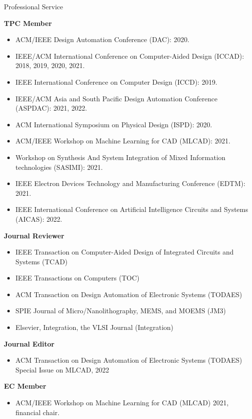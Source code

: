 
\begin{rSection}{Professional Service}

\textbf{TPC Member}
\begin{itemize}
    \item ACM/IEEE Design Automation Conference (DAC): 2020.
    \item IEEE/ACM International Conference on Computer-Aided Design (ICCAD): 2018, 2019, 2020, 2021.
    \item IEEE International Conference on Computer Design (ICCD): 2019.
    \item IEEE/ACM Asia and South Pacific Design Automation Conference (ASPDAC): 2021, 2022.
    \item ACM International Symposium on Physical Design (ISPD): 2020.
    \item ACM/IEEE Workshop on Machine Learning for CAD (MLCAD): 2021.
    \item Workshop on Synthesis And System Integration of Mixed Information technologies (SASIMI): 2021.
    \item IEEE Electron Devices Technology and Manufacturing Conference (EDTM): 2021.
    \item IEEE International Conference on Artificial Intelligence Circuits and Systems (AICAS): 2022. 
\end{itemize}

\textbf{Journal Reviewer}
\begin{itemize}
    \item IEEE Transaction on Computer-Aided Design of Integrated Circuits and Systems (TCAD)
    \item IEEE Transactions on Computers (TOC)
    \item ACM Transaction on Design Automation of Electronic Systems (TODAES)
    \item SPIE Journal of Micro/Nanolithography, MEMS, and MOEMS (JM3)
    \item Elsevier, Integration, the VLSI Journal (Integration)
\end{itemize}

\textbf{Journal Editor}
\begin{itemize}
    \item ACM Transaction on Design Automation of Electronic Systems (TODAES) Special Issue on MLCAD, 2022
\end{itemize}

\textbf{EC Member}
\begin{itemize}
    \item ACM/IEEE Workshop on Machine Learning for CAD (MLCAD) 2021, financial chair.
\end{itemize}

\end{rSection}
